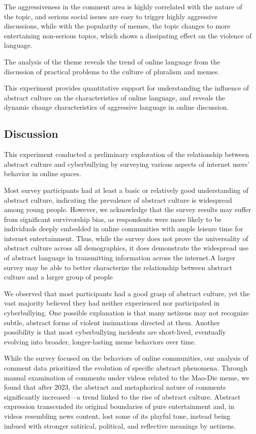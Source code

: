 \documentclass[12pt,a4paper]{ctexart}
\theoremstyle{MyLineTheoremStyle}
\theoremstyle{MyBlockTheoremStyle}
\theoremstyle{MySubsubsectionStyle}
\begin{document}
The aggressiveness in the comment area is highly correlated with the nature of the topic, and serious social issues are easy to trigger highly aggressive discussions, while with the popularity of memes, the topic changes to more entertaining non-serious topics, which shows a dissipating effect on the violence of language.

The analysis of the theme reveals the trend of online language from the discussion of practical problems to the culture of pluralism and memes.

This experiment provides quantitative support for understanding the influence of abstract culture on the characteristics of online language, and reveals the dynamic change characteristics of aggressive language in online discussion.

\subsection{Discussion}

This experiment conducted a preliminary exploration of the relationship between abstract culture and cyberbullying by surveying various aspects of internet users' behavior in online spaces.

Most survey participants had at least a basic or relatively good understanding of abstract culture, indicating the prevalence of abstract culture is widespread among young people. However, we acknowledge that the survey results may suffer from significant survivorship bias, as respondents were more likely to be individuals deeply embedded in online communities with ample leisure time for internet entertainment. Thus, while the survey does not prove the universality of abstract culture across all demographics, it does demonstrate the widespread use of abstract language in transmitting information across the internet.A larger survey may be able to better characterize the relationship between abstract culture and a larger group of people

We observed that most participants had a good grasp of abstract culture, yet the vast majority believed they had neither experienced nor participated in cyberbullying. One possible explanation is that many netizens may not recognize subtle, abstract forms of violent insinuations directed at them. Another possibility is that most cyberbullying incidents are short-lived, eventually evolving into broader, longer-lasting meme behaviors over time.

While the survey focused on the behaviors of online communities, our analysis of comment data prioritized the evolution of specific abstract phenomena. Through manual examination of comments under videos related to the Mao-Die meme, we found that after 2023, the abstract and metaphorical nature of comments significantly increased—a trend linked to the rise of abstract culture. Abstract expression transcended its original boundaries of pure entertainment and, in videos resembling news content, lost some of its playful tone, instead being imbued with stronger satirical, political, and reflective meanings by netizens.
\end{document}
